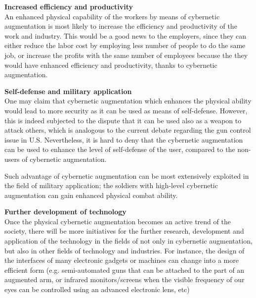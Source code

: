 {\bf Increased efficiency and productivity}\\
An enhanced physical capability of the workers by means of cybernetic augmentation is most likely to increase the efficiency and productivity of the work and industry. This would be a good news to the employers, since they can either reduce the labor cost by employing less number of people to do the same job, or increase the profits with the same number of employees because the they would have enhanced efficiency and productivity, thanks to cybernetic augmentation.

{\bf Self-defense and military application}\\
One may claim that cybernetic augmentation which enhances the physical ability would lead to more security as it can be used as means of self-defense. However, this is indeed subjected to the dispute that it can be used also as a weapon to attack others, which is analogous to the current debate regarding the gun control issue in U.S. Nevertheless, it is hard to deny that the cybernetic augmentation can be used to enhance the level of self-defense of the user, compared to the non-users of cybernetic augmentation.

Such advantage of cybernetic augmentation can be most extensively exploited in the field of military application; the soldiers with high-level cybernetic augmentation can gain enhanced physical combat ability.

{\bf Further development of technology}\\
Once the physical cybernetic augmentation becomes an active trend of the society, there will be more initiatives for the further research, development and application of the technology in the fields of not only in cybernetic augmentation, but also in other fields of technology and industries. For instance, the design of the interfaces of many electronic gadgets or machines can change into a more efficient form (e.g. semi-automated guns that can be attached to the part of an augmented arm, or infrared monitors/screens when the visible frequency of our eyes can be controlled using an advanced electronic lens, etc)


